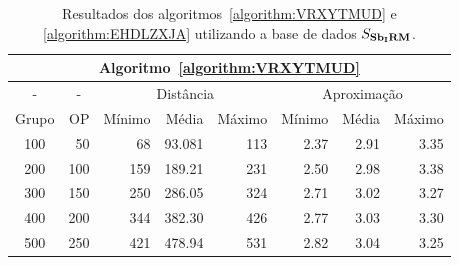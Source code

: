 \begin{table}[!htb]
  \caption{Resultados dos algoritmos~\ref{algorithm:VRXYTMUD} e \ref{algorithm:EHDLZXJA} utilizando a base de dados $S_{\textbf{Sb\textsubscript{I}RM}}{}$.}
  \label{table:HZHMCLUM}
  \centering
  \begin{tabular}{|c|r|r|r|r|r|r|r|}
    \hline
    \multicolumn{8}{|c|}{Algoritmo~\ref{algorithm:VRXYTMUD}}                                                                    \\ \hline
      -      & \multicolumn{1}{c|}{-} & \multicolumn{3}{c|}{Distância}             & \multicolumn{3}{c|}{Aproximação}           \\ \hline
    Grupo    & OP                     & Mínimo       & Média        & Máximo       & Mínimo       & Média        & Máximo       \\ \hline  
    100      & 50                     & 68           & 93.081       & 113          & 2.37         & 2.91         & 3.35         \\ \hline
    200      & 100                    & 159          & 189.21       & 231          & 2.50         & 2.98         & 3.38         \\ \hline
    300      & 150                    & 250          & 286.05       & 324          & 2.71         & 3.02         & 3.27         \\ \hline
    400      & 200                    & 344          & 382.30       & 426          & 2.77         & 3.03         & 3.30         \\ \hline
    500      & 250                    & 421          & 478.94       & 531          & 2.82         & 3.04         & 3.25         \\ \hline    
  \end{tabular}

  \vspace{5mm}


\end{table}
